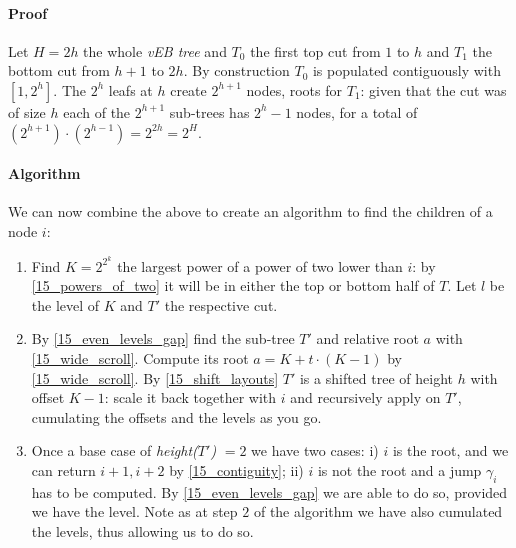 \paragraph{Proof} Let $H = 2h$ the whole \emph{vEB tree} and $T_0$ the first top cut from $1$ to $h$ and $T_1$ the bottom cut from $h + 1$ to $2h$.
By construction $T_0$ is populated contiguously with $[1, 2^h]$.
The $2^h$ leafs at $h$ create $2^{h + 1}$ nodes, roots for $T_1$: given that the cut was of size $h$ each of the $2^{h + 1}$ sub-trees has $2^h - 1$ nodes, for a total of $(2^{h + 1}) \cdot (2^{h - 1}) = 2^{2h} = 2^H$.

\paragraph{Algorithm} We can now combine the above to create an algorithm to find the children of a node $i$:
	\begin{enumerate}
	\item Find $K = 2^{2^k}$ the largest power of a power of two lower than $i$: by \ref{15_powers_of_two} it will be in either the top or bottom half of $T$.
	Let $l$ be the level of $K$ and $T'$ the respective cut.
	\item By \ref{15_even_levels_gap} find the sub-tree $T'$ and relative root $a$ with \ref{15_wide_scroll}.
	Compute its root $a = K + t \cdot (K - 1)$ by \ref{15_wide_scroll}.
	By \ref{15_shift_layouts} $T'$ is a shifted tree of height $h$ with offset $K - 1$: scale it back together with $i$ and recursively apply on $T'$, cumulating the offsets and the levels as you go.
	\item Once a base case of \emph{height($T'$)} $= 2$ we have two cases: i) $i$ is the root, and we can return $i + 1, i + 2$ by \ref{15_contiguity}; ii) $i$ is not the root and a jump $\gamma_i$ has to be computed.
	By \ref{15_even_levels_gap} we are able to do so, provided we have the level.
	Note as at step $2$ of the algorithm we have also cumulated the levels, thus allowing us to do so.
	\end{enumerate}